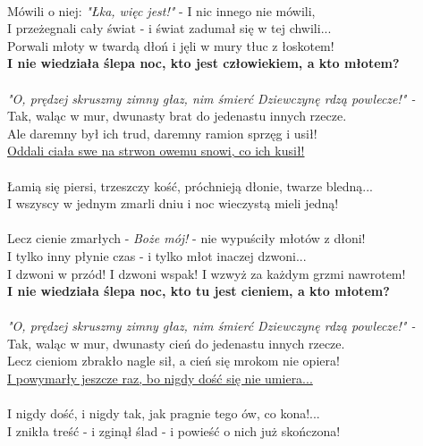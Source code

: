 \documentclass[12pt]{article}
\begin{document}
\paragraph{}

Mówili o niej: \textit{"Łka, więc jest!"} - I nic innego nie mówili,\\
I przeżegnali cały świat - i świat zadumał się w tej chwili...\\
Porwali młoty w twardą dłoń i jęli w mury tłuc z łoskotem!\\
\textbf{I nie wiedziała ślepa noc, kto jest człowiekiem, a kto młotem?}\\
\\
\textit{"O, prędzej skruszmy zimny głaz, nim śmierć Dziewczynę rdzą powlecze!" -}\\
Tak, waląc w mur, dwunasty brat do jedenastu innych rzecze.\\
Ale daremny był ich trud, daremny ramion sprzęg i usił!\\
\underline{Oddali ciała swe na strwon owemu snowi, co ich kusił!}\\
\\
Łamią się piersi, trzeszczy kość, próchnieją dłonie, twarze bledną...\\
I wszyscy w jednym zmarli dniu i noc wieczystą mieli jedną!\\
\paragraph{}

Lecz cienie zmarłych - \textit{Boże mój!} - nie wypuściły młotów z dłoni!\\
I tylko inny płynie czas - i tylko młot inaczej dzwoni...\\
I dzwoni w przód! I dzwoni wspak! I wzwyż za każdym grzmi nawrotem!\\
\textbf{I nie wiedziała ślepa noc, kto tu jest cieniem, a kto młotem?}\\
\\
\textit{"O, prędzej skruszmy zimny głaz, nim śmierć Dziewczynę rdzą powlecze!" -}\\
Tak, waląc w mur, dwunasty cień do jedenastu innych rzecze.\\
Lecz cieniom zbrakło nagle sił, a cień się mrokom nie opiera!\\
\underline{I powymarły jeszcze raz, bo nigdy dość się nie umiera...}\\
\\
I nigdy dość, i nigdy tak, jak pragnie tego ów, co kona!...\\
I znikła treść - i zginął ślad - i powieść o nich już skończona!\\
\end{document}
